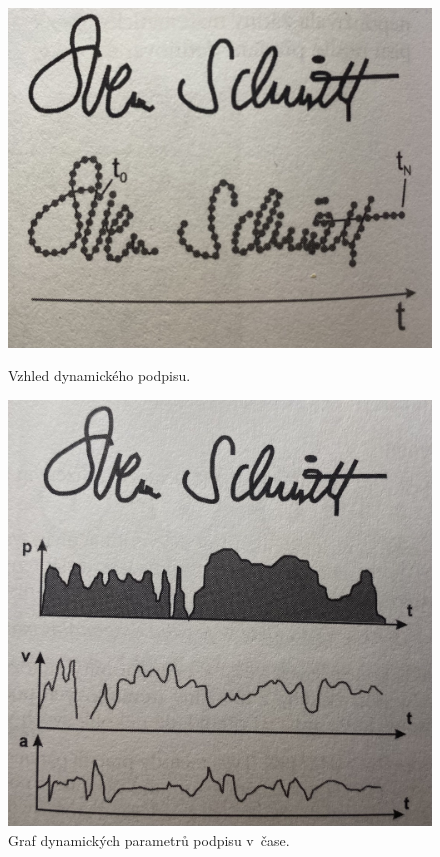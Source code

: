 \begin{figure}[H]
  \centering
  \begin{minipage}{0.45\textwidth}
      \centering
      \includegraphics[width=\textwidth]{obrazky-figures/vzhled_dynamickeho.jpg}
      \caption{Vzhled dynamického podpisu.~\cite{RakRoman2008}}
      \label{fig:vzhled_dynamickeho_podpisu}
  \end{minipage}\hfill
  \begin{minipage}{0.45\textwidth}
      \centering
      \includegraphics[width=\textwidth]{obrazky-figures/graf_parametru.jpg}
      \caption{Graf dynamických parametrů podpisu v~čase.~\cite{RakRoman2008}}
      \label{fig:graf_dynamickych_parametru}
  \end{minipage}
\end{figure}

